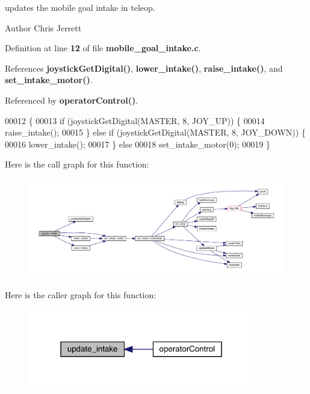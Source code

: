updates the mobile goal intake in teleop. 

\begin{DoxyAuthor}{Author}
Chris Jerrett 
\end{DoxyAuthor}


Definition at line \textbf{ 12} of file \textbf{ mobile\+\_\+goal\+\_\+intake.\+c}.



References \textbf{ joystick\+Get\+Digital()}, \textbf{ lower\+\_\+intake()}, \textbf{ raise\+\_\+intake()}, and \textbf{ set\+\_\+intake\+\_\+motor()}.



Referenced by \textbf{ operator\+Control()}.


\begin{DoxyCode}
00012                      \{
00013   \textcolor{keywordflow}{if} (joystickGetDigital(MASTER, 8, JOY\_UP)) \{
00014     raise_intake();
00015   \} \textcolor{keywordflow}{else} \textcolor{keywordflow}{if} (joystickGetDigital(MASTER, 8, JOY\_DOWN)) \{
00016     lower_intake();
00017   \} \textcolor{keywordflow}{else}
00018     set_intake_motor(0);
00019 \}
\end{DoxyCode}
Here is the call graph for this function\+:
\nopagebreak
\begin{figure}[H]
\begin{center}
\leavevmode
\includegraphics[width=350pt]{mobile__goal__intake_8h_a5d7bad8a208988af743fd2e68f111286_cgraph}
\end{center}
\end{figure}
Here is the caller graph for this function\+:
\nopagebreak
\begin{figure}[H]
\begin{center}
\leavevmode
\includegraphics[width=280pt]{mobile__goal__intake_8h_a5d7bad8a208988af743fd2e68f111286_icgraph}
\end{center}
\end{figure}

